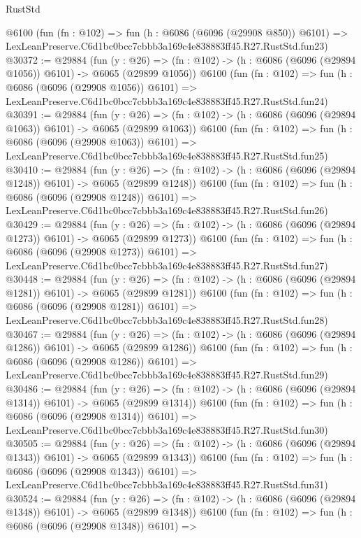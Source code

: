 \begin{lexlean}{RustStd}
\begin{coremodule}
    @6100
    (fun (fn : @102) =>
    fun (h : @6086 (@6096 (@29908 @850)) @6101) =>
    LexLeanPreserve.C6d1bc0bcc7cbbb3a169c4e838883ff45.R27.RustStd.fun23)
@30372 := @29884
    (fun (y : @26) =>
    (fn : @102) -> (h : @6086 (@6096 (@29894 @1056)) @6101) -> @6065 (@29899 @1056))
    @6100
    (fun (fn : @102) =>
    fun (h : @6086 (@6096 (@29908 @1056)) @6101) =>
    LexLeanPreserve.C6d1bc0bcc7cbbb3a169c4e838883ff45.R27.RustStd.fun24)
@30391 := @29884
    (fun (y : @26) =>
    (fn : @102) -> (h : @6086 (@6096 (@29894 @1063)) @6101) -> @6065 (@29899 @1063))
    @6100
    (fun (fn : @102) =>
    fun (h : @6086 (@6096 (@29908 @1063)) @6101) =>
    LexLeanPreserve.C6d1bc0bcc7cbbb3a169c4e838883ff45.R27.RustStd.fun25)
@30410 := @29884
    (fun (y : @26) =>
    (fn : @102) -> (h : @6086 (@6096 (@29894 @1248)) @6101) -> @6065 (@29899 @1248))
    @6100
    (fun (fn : @102) =>
    fun (h : @6086 (@6096 (@29908 @1248)) @6101) =>
    LexLeanPreserve.C6d1bc0bcc7cbbb3a169c4e838883ff45.R27.RustStd.fun26)
@30429 := @29884
    (fun (y : @26) =>
    (fn : @102) -> (h : @6086 (@6096 (@29894 @1273)) @6101) -> @6065 (@29899 @1273))
    @6100
    (fun (fn : @102) =>
    fun (h : @6086 (@6096 (@29908 @1273)) @6101) =>
    LexLeanPreserve.C6d1bc0bcc7cbbb3a169c4e838883ff45.R27.RustStd.fun27)
@30448 := @29884
    (fun (y : @26) =>
    (fn : @102) -> (h : @6086 (@6096 (@29894 @1281)) @6101) -> @6065 (@29899 @1281))
    @6100
    (fun (fn : @102) =>
    fun (h : @6086 (@6096 (@29908 @1281)) @6101) =>
    LexLeanPreserve.C6d1bc0bcc7cbbb3a169c4e838883ff45.R27.RustStd.fun28)
@30467 := @29884
    (fun (y : @26) =>
    (fn : @102) -> (h : @6086 (@6096 (@29894 @1286)) @6101) -> @6065 (@29899 @1286))
    @6100
    (fun (fn : @102) =>
    fun (h : @6086 (@6096 (@29908 @1286)) @6101) =>
    LexLeanPreserve.C6d1bc0bcc7cbbb3a169c4e838883ff45.R27.RustStd.fun29)
@30486 := @29884
    (fun (y : @26) =>
    (fn : @102) -> (h : @6086 (@6096 (@29894 @1314)) @6101) -> @6065 (@29899 @1314))
    @6100
    (fun (fn : @102) =>
    fun (h : @6086 (@6096 (@29908 @1314)) @6101) =>
    LexLeanPreserve.C6d1bc0bcc7cbbb3a169c4e838883ff45.R27.RustStd.fun30)
@30505 := @29884
    (fun (y : @26) =>
    (fn : @102) -> (h : @6086 (@6096 (@29894 @1343)) @6101) -> @6065 (@29899 @1343))
    @6100
    (fun (fn : @102) =>
    fun (h : @6086 (@6096 (@29908 @1343)) @6101) =>
    LexLeanPreserve.C6d1bc0bcc7cbbb3a169c4e838883ff45.R27.RustStd.fun31)
@30524 := @29884
    (fun (y : @26) =>
    (fn : @102) -> (h : @6086 (@6096 (@29894 @1348)) @6101) -> @6065 (@29899 @1348))
    @6100
    (fun (fn : @102) =>
    fun (h : @6086 (@6096 (@29908 @1348)) @6101) =>

\end{coremodule}
\end{lexlean}
